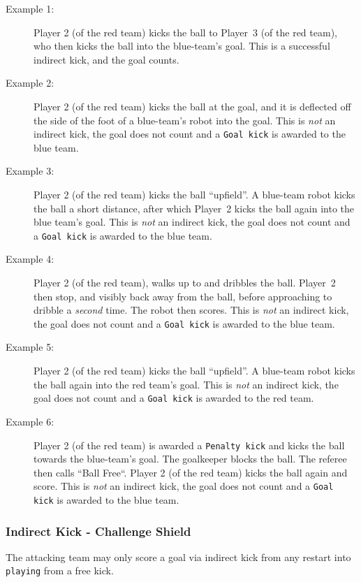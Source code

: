 \begin{description}
  \item[Example 1:] Player 2 (of the red team) kicks the ball to Player~3 (of the red team), who then kicks the ball into the blue-team's goal.
  This is a successful indirect kick, and the goal counts.
  \item[Example 2:] Player 2 (of the red team) kicks the ball at the goal, and it is deflected off the side of the foot of a blue-team's robot into the goal.
    This is \textit{not} an indirect kick, the goal does not count and a \texttt{Goal kick} is awarded to the blue team.
  \item[Example 3:] Player 2 (of the red team) kicks the ball ``upfield''.
    A blue-team robot kicks the ball a short distance, after which Player~2 kicks the ball again into the blue team's goal.
    This is \textit{not} an indirect kick, the goal does not count and a \texttt{Goal kick} is awarded to the blue team.
  \item[Example 4:] Player 2 (of the red team), walks up to and dribbles the ball.
    Player~2 then stop, and visibly back away from the ball, before approaching to dribble a \textit{second} time. The robot then scores. 
    This is \textit{not} an indirect kick, the goal does not count and a \texttt{Goal kick} is awarded to the blue team.
  \item[Example 5:] Player 2 (of the red team) kicks the ball ``upfield''.
  A blue-team robot kicks the ball again into the red team's goal.
  This is \textit{not} an indirect kick, the goal does not count and a \texttt{Goal kick} is awarded to the red team.
  \item[Example 6:] Player 2 (of the red team) is awarded a \texttt{Penalty kick} and kicks the ball towards the blue-team's goal. The goalkeeper blocks the ball. The referee then calls ``Ball Free``. 
  Player 2 (of the red team) kicks the ball again and score. 
  This is \textit{not} an indirect kick, the goal does not count and a \texttt{Goal kick} is awarded to the blue team.
\end{description}

\subsubsection{Indirect Kick - Challenge Shield}
\label{sec:indirect_kick_challenger}

The attacking team may only score a goal via indirect kick from any restart into \texttt{playing} from a free kick.

